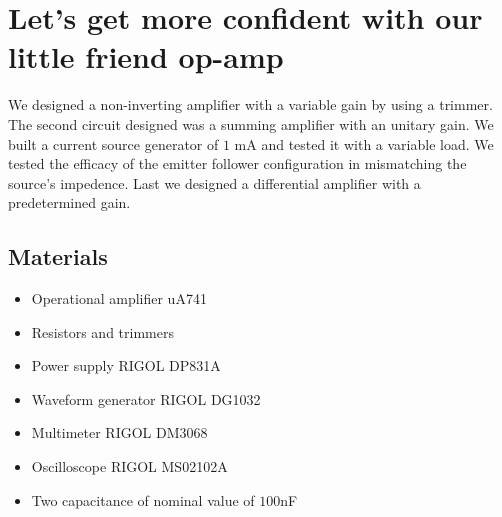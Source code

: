 \chapter{Let's get more confident with our little friend op-amp}
We designed a non-inverting amplifier with a variable gain by using a trimmer. The second circuit designed was a summing amplifier with an unitary gain. We built a current source generator of $1$ mA and tested it with a variable load. We tested the efficacy of the emitter follower configuration in mismatching the source's impedence. Last we designed a differential amplifier with a predetermined gain.
\section{Materials}
\begin{itemize}
\item Operational amplifier uA741
\item Resistors and trimmers
\item Power supply RIGOL DP831A
\item Waveform generator RIGOL DG1032
\item Multimeter RIGOL DM3068
\item Oscilloscope RIGOL MS02102A
\item Two capacitance of nominal value of $100$nF
\end{itemize}
